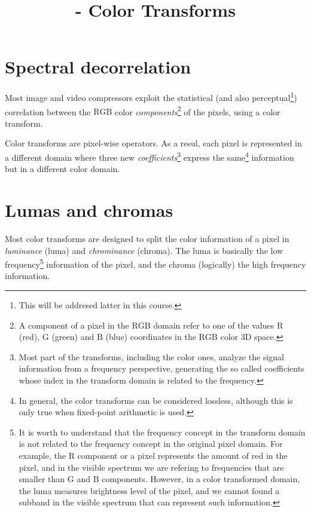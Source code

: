 

\title{\SM{} - Color Transforms}

\maketitle
\tableofcontents

\section{Spectral decorrelation}

Most image and video compressors exploit the statistical (and also
perceptual\footnote{This will be addresed latter in this course.})
correlation between the $\text{RGB}$ color
\emph{components}\footnote{A component of a pixel in the $\text{RGB}$
domain refer to one of the values $\text{R}$ (red), $\text{G}$ (green)
and $\text{B}$ (blue) coordinates in the $\text{RGB}$ color 3D space.}
of the pixels, using a color transform.

Color transforms are pixel-wise operators. As a resul, each pixel is
represented in a different domain where three new
\emph{coefficients}\footnote{Most part of the transforms, including
the color ones, analyze the signal information from a frequency
perspective, generating the so called coefficients whose index in the
transform domain is related to the frequency.} express the
same\footnote{In general, the color transforms can be considered
lossless, although this is only true when fixed-point arithmetic is
used.} information but in a different color domain.

\section{Lumas and chromas}

Most color transforms are designed to split the color information of a
pixel in \emph{luminance} (luma) and \emph{chrominance} (chroma). The
luma is basically the low frequency\footnote{It is worth to understand
that the frequency concept in the transform domain is not related to
the frequency concept in the original pixel domain. For example, the
$\text{R}$ component or a pixel represents the amount of red in the
pixel, and in the visible spectrum we are refering to frequencies that
are smaller than $\text{G}$ and $\text{B}$ components. However, in a
color transformed domain, the luma measures brightness level of the
pixel, and we cannot found a subband in the visible spectrum that can
represent such information.} information of the pixel, and the chroma
(logically) the high frequency information.

